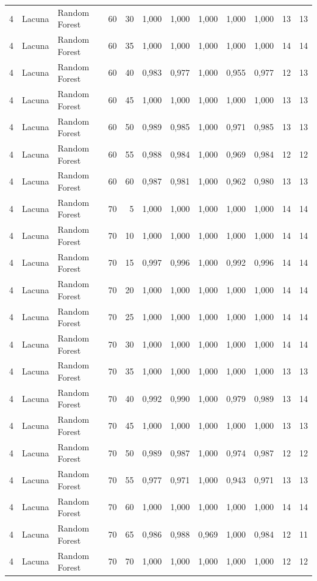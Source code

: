\begin{longtable}{@{}rllrrrrrrrrr@{}}
4 & Lacuna & Random Forest & 60 & 30 & 1,000 & 1,000 & 1,000 & 1,000 & 1,000 & 13 & 13 \\
4 & Lacuna & Random Forest & 60 & 35 & 1,000 & 1,000 & 1,000 & 1,000 & 1,000 & 14 & 14 \\
4 & Lacuna & Random Forest & 60 & 40 & 0,983 & 0,977 & 1,000 & 0,955 & 0,977 & 12 & 13 \\
4 & Lacuna & Random Forest & 60 & 45 & 1,000 & 1,000 & 1,000 & 1,000 & 1,000 & 13 & 13 \\
4 & Lacuna & Random Forest & 60 & 50 & 0,989 & 0,985 & 1,000 & 0,971 & 0,985 & 13 & 13 \\
4 & Lacuna & Random Forest & 60 & 55 & 0,988 & 0,984 & 1,000 & 0,969 & 0,984 & 12 & 12 \\
4 & Lacuna & Random Forest & 60 & 60 & 0,987 & 0,981 & 1,000 & 0,962 & 0,980 & 13 & 13 \\
4 & Lacuna & Random Forest & 70 & 5 & 1,000 & 1,000 & 1,000 & 1,000 & 1,000 & 14 & 14 \\
4 & Lacuna & Random Forest & 70 & 10 & 1,000 & 1,000 & 1,000 & 1,000 & 1,000 & 14 & 14 \\
4 & Lacuna & Random Forest & 70 & 15 & 0,997 & 0,996 & 1,000 & 0,992 & 0,996 & 14 & 14 \\
4 & Lacuna & Random Forest & 70 & 20 & 1,000 & 1,000 & 1,000 & 1,000 & 1,000 & 14 & 14 \\
4 & Lacuna & Random Forest & 70 & 25 & 1,000 & 1,000 & 1,000 & 1,000 & 1,000 & 14 & 14 \\
4 & Lacuna & Random Forest & 70 & 30 & 1,000 & 1,000 & 1,000 & 1,000 & 1,000 & 14 & 14 \\
4 & Lacuna & Random Forest & 70 & 35 & 1,000 & 1,000 & 1,000 & 1,000 & 1,000 & 13 & 13 \\
4 & Lacuna & Random Forest & 70 & 40 & 0,992 & 0,990 & 1,000 & 0,979 & 0,989 & 13 & 14 \\
4 & Lacuna & Random Forest & 70 & 45 & 1,000 & 1,000 & 1,000 & 1,000 & 1,000 & 13 & 13 \\
4 & Lacuna & Random Forest & 70 & 50 & 0,989 & 0,987 & 1,000 & 0,974 & 0,987 & 12 & 12 \\
4 & Lacuna & Random Forest & 70 & 55 & 0,977 & 0,971 & 1,000 & 0,943 & 0,971 & 13 & 13 \\
4 & Lacuna & Random Forest & 70 & 60 & 1,000 & 1,000 & 1,000 & 1,000 & 1,000 & 14 & 14 \\
4 & Lacuna & Random Forest & 70 & 65 & 0,986 & 0,988 & 0,969 & 1,000 & 0,984 & 12 & 11 \\
4 & Lacuna & Random Forest & 70 & 70 & 1,000 & 1,000 & 1,000 & 1,000 & 1,000 & 12 & 12 \\

\end{longtable}
